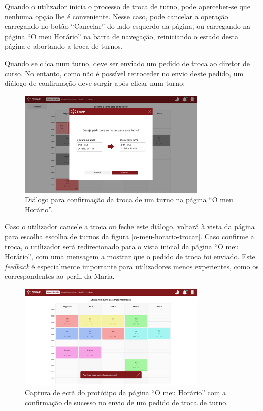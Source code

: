 \documentclass[12pt, a4paper]{article}
\begin{document}
Quando o utilizador inicia o processo de troca de turno, pode aperceber-se que nenhuma opção lhe é
conveniente. Nesse caso, pode cancelar a operação carregando no botão ``Cancelar'' do lado esquerdo
da página, ou carregando na página ``O meu Horário'' na barra de navegação, reiniciando o estado
desta página e abortando a troca de turnos.

Quando se clica num turno, deve ser enviado um pedido de troca ao diretor de curso. No entanto,
como não é possível retroceder no envio deste pedido, um diálogo de confirmação deve surgir após
clicar num turno:

\begin{figure}[H]
    \centering
    \includegraphics[width=0.8\textwidth]{res/prototype/dialogo-confirmacao-troca.png}
    \caption{Diálogo para confirmação da troca de um turno na página ``O meu Horário''.}
    \label{dialogo-confirmacao-troca}
\end{figure}

Caso o utilizador cancele a troca ou feche este diálogo, voltará à vista da página para escolha
escolha de turnos da figura \ref{o-meu-horario-trocar}. Caso confirme a troca, o utilizador será
redirecionado para o vista inicial da página ``O meu Horário'', com uma mensagem a mostrar que o
pedido de troca foi enviado. Este \emph{feedback} é especialmente importante para utilizadores menos
experientes, como os correspondentes ao perfil da Maria.

\begin{figure}[H]
    \centering
    \includegraphics[width=0.8\textwidth]{res/prototype/o-meu-horario-toast-sucesso-troca.png}
    \caption{
        \onehalfspacing
        Captura de ecrã do protótipo da página ``O meu Horário'' com a confirmação de sucesso no
        envio de um pedido de troca de turno.
    }
    \label{o-meu-horario-toast-sucesso-troca}
\end{figure}
\end{document}
